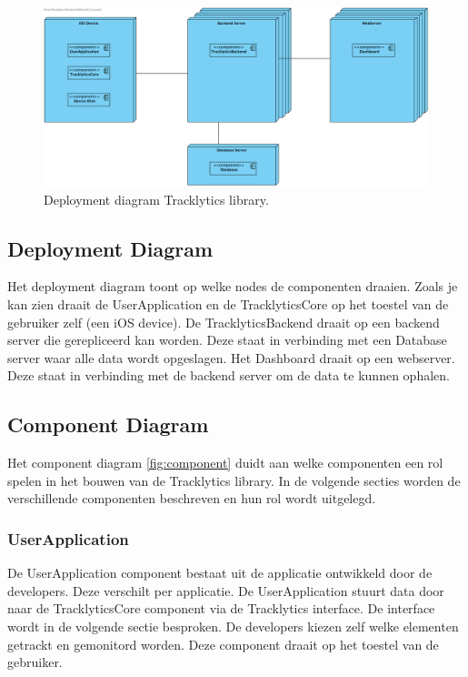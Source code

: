 \begin{figure}[!h]
  \centering
  \includegraphics[scale=0.30]{Afbeeldingen/Architectuur/Deployment}
  \caption{Deployment diagram Tracklytics library.}
  \label{fig:deployment}
\end{figure}

\subsection{Deployment Diagram}
Het deployment diagram toont op welke nodes de componenten draaien. Zoals je kan zien draait de UserApplication en de TracklyticsCore op het toestel van de gebruiker zelf (een iOS device). De TracklyticsBackend draait op een backend server die gerepliceerd kan worden. Deze staat in verbinding met een Database server waar alle data wordt opgeslagen. Het Dashboard draait op een webserver. Deze staat in verbinding met de backend server om de data te kunnen ophalen.

\subsection{Component Diagram}
Het component diagram \ref{fig:component} duidt aan welke componenten een rol spelen in het bouwen van de Tracklytics library. In de volgende secties worden de verschillende componenten beschreven en hun rol wordt uitgelegd.


\subsubsection{UserApplication}
De UserApplication component bestaat uit de applicatie ontwikkeld door de developers. Deze verschilt per applicatie. De UserApplication stuurt data door naar de TracklyticsCore component via de Tracklytics interface. De interface wordt in de volgende sectie besproken. De developers kiezen zelf welke elementen getrackt en gemonitord worden. Deze component draait op het toestel van de gebruiker.

